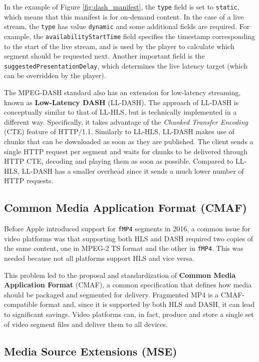 In the example of Figure \ref{fig:dash_manifest}, the \texttt{type} field is set to \texttt{static}, which means that this manifest is for on-demand content. In the case of a live stream, the \texttt{type} has value \texttt{dynamic} and some additional fields are required. For example, the \texttt{availabilityStartTime} field specifies the timestamp corresponding to the start of the live stream, and is used by the player to calculate which segment should be requested next. Another important field is the \texttt{suggestedPresentationDelay}, which determines the live latency target (which can be overridden by the player).

The MPEG-DASH standard also has an extension for low-latency streaming, known as \textbf{Low-Latency DASH} (LL-DASH). The approach of LL-DASH is conceptually similar to that of LL-HLS, but is technically implemented in a different way. Specifically, it takes advantage of the \textit{Chunked Transfer Encoding} (CTE) feature of HTTP/1.1. Similarly to LL-HLS, LL-DASH makes use of chunks that can be downloaded as soon as they are published. The client sends a single HTTP request per segment and waits for chunks to be delivered through HTTP CTE, decoding and playing them as soon as possible. Compared to LL-HLS, LL-DASH has a smaller overhead since it sends a much lower number of HTTP requests.\cite{llhls_vs_lldash}

\subsection{Common Media Application Format (CMAF)}
\label{sec:bg/technologies/cmaf}

Before Apple introduced support for \texttt{fMP4} segments in 2016, a common issue for video platforms was that supporting both HLS and DASH required two copies of the same content, one in MPEG-2 TS format and the other in \texttt{fMP4}. This was needed because not all platforms support HLS and vice versa.

This problem led to the proposal and standardization of \textbf{Common Media Application Format} (CMAF), a common specification that defines how media should be packaged and segmented for delivery. Fragmented MP4 is a CMAF-compatible format and, since it is supported by both HLS and DASH, it can lead to significant savings. Video platforms can, in fact, produce and store a single set of video segment files and deliver them to all devices.\cite{cmaf}

\subsection{Media Source Extensions (MSE)}
\label{sec:bg/technologies/mse}

